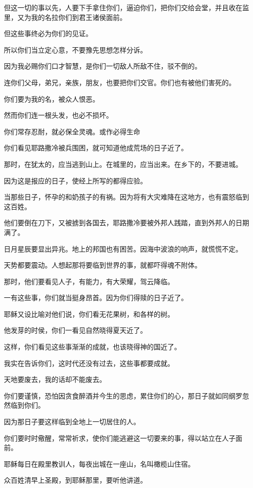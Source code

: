 \documentclass[12pt,oneside]{book}
\begin{document}
但这一切的事以先，人要下手拿住你们，逼迫你们，把你们交给会堂，并且收在监里，又为我的名拉你们到君王诸侯面前。

但这些事终必为你们的见证。

所以你们当立定心意，不要豫先思想怎样分诉。

因为我必赐你们口才智慧，是你们一切敌人所敌不住，驳不倒的。

连你们父母，弟兄，亲族，朋友，也要把你们交官。你们也有被他们害死的。

你们要为我的名，被众人恨恶。

然而你们连一根头发，也必不损坏。

你们常存忍耐，就必保全灵魂。或作必得生命

你们看见耶路撒冷被兵围困，就可知道他成荒场的日子近了。

那时，在犹太的，应当逃到山上。在城里的，应当出来。在乡下的，不要进城。

因为这是报应的日子，使经上所写的都得应验。

当那些日子，怀孕的和奶孩子的有祸。因为将有大灾难降在这地方，也有震怒临到这百姓。

他们要倒在刀下，又被掳到各国去，耶路撒冷要被外邦人践踏，直到外邦人的日期满了。

日月星辰要显出异兆。地上的邦国也有困苦。因海中波浪的响声，就慌慌不定。

天势都要震动。人想起那将要临到世界的事，就都吓得魂不附体。

那时，他们要看见人子，有能力，有大荣耀，驾云降临。

一有这些事，你们就当挺身昂首。因为你们得赎的日子近了。

耶稣又设比喻对他们说，你们看无花果树，和各样的树。

他发芽的时侯，你们一看见自然晓得夏天近了。

这样，你们看见这些事渐渐的成就，也该晓得神的国近了。

我实在告诉你们，这时代还没有过去，这些事都要成就。

天地要废去，我的话却不能废去。

你们要谨慎，恐怕因贪食醉酒并今生的思虑，累住你们的心，那日子就如同纲罗忽然临到你们。

因为那日子要这样临到全地上一切居住的人。

你们要时时儆醒，常常祈求，使你们能逃避这一切要来的事，得以站立在人子面前。

耶稣每日在殿里教训人，每夜出城在一座山，名叫橄榄山住宿。

众百姓清早上圣殿，到耶稣那里，要听他讲道。
\end{document}
